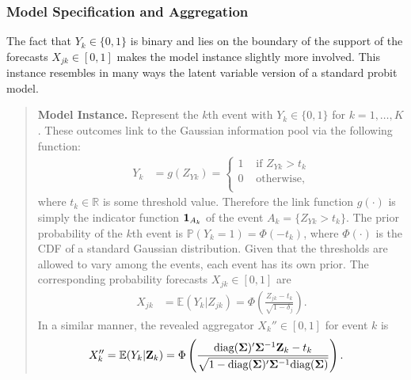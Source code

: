 \documentclass[11pt]{article}
\newcommand{\R}{\mathbb{R}}
\renewcommand{\P}{\mathbb{P}}
\newcommand{\E}{\mathbb{E}}
\theoremstyle{definition}
\theoremstyle{definition}
\def\one{{\bf 1}}
\def\bSigma{{\bf \Sigma}}
\def\Z{{\bf Z}}
\def\P{{\mathbb P}}
\def\E{{\mathbb E}}
\def\diag{\text{diag}}
\def\diag{\text{diag}}
\begin{document}
\subsubsection{Model Specification and Aggregation}
The fact that  $Y_k \in \{0,1\}$ is binary and lies on the boundary of the support of the forecasts $X_{jk} \in [0,1]$ makes the model instance slightly more involved. This instance resembles in many ways the latent variable version of a standard probit model. 
\begin{quote}
\textbf{Model Instance.} Represent the $k$th event with $Y_k \in \{0,1\}$ for $k = 1, \dots, K$. These outcomes link to the Gaussian information pool via the following function:
\begin{align*}
Y_k &= g(Z_{Yk}) = \begin{cases}
1 & \text{ if } Z_{Yk} > t_k\\
0 & \text{ otherwise},\\
\end{cases}
\end{align*}
where $t_k \in \R$ is some threshold value. Therefore the link function $g(\cdot)$ is simply the indicator function $\one_{A_k}$ of the event $A_k = \{Z_{Yk} > t_k\}$. The prior probability of the $k$th event is $\P(Y_k = 1) = \Phi(-t_k)$, where $\Phi(\cdot)$ is the CDF of a standard Gaussian distribution. Given that the thresholds are allowed to vary among the events, each event has its own prior. 
The corresponding probability forecasts $X_{jk} \in [0,1]$ are
\begin{align*}
X_{jk} &= \E(Y_k | Z_{jk}) = \Phi\left( \frac{Z_{jk} - t_k}{\sqrt{1-\delta_j}}\right).
\end{align*}
In a similar manner, 
 the revealed aggregator $X_k'' \in [0,1]$ for event $k$ is
\begin{align}
X_{k}'' &= \E(Y_k | \Z_k) = \Phi\left( \frac{\diag(\bSigma)'\bSigma^{-1}\Z_k - t_k}{\sqrt{1-\diag(\bSigma)'\bSigma^{-1}\diag(\bSigma)}}\right). \label{RevAgg}
\end{align}
\end{quote}

\end{document}
